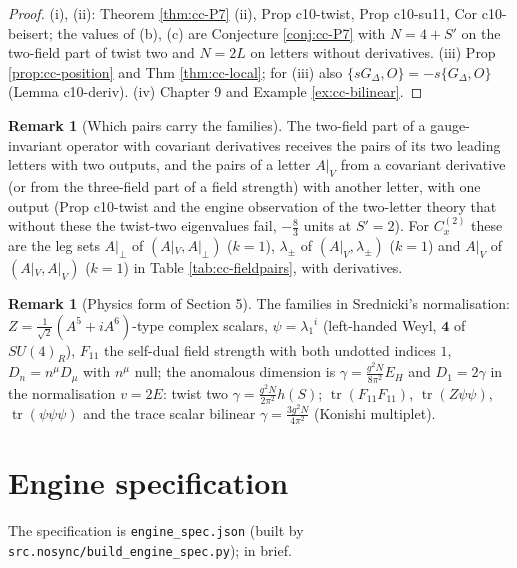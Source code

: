 \documentclass[11pt]{article}
\numberwithin{equation}{section}
\theoremstyle{plain}
\theoremstyle{definition}
\newtheorem{remark}[theorem]{Remark}
\newcommand{\Ap}{A|_{\perp}}
\newcommand{\AV}{A|_V}
\begin{document}
\begin{proof}
(i), (ii): Theorem \ref{thm:cc-P7} (ii), Prop c10-twist, Prop c10-su11, Cor c10-beisert; the values of (b), (c) are Conjecture \ref{conj:cc-P7} with $N=4+S'$ on the two-field part of twist two and $N=2L$ on letters without derivatives. (iii) Prop \ref{prop:cc-position} and Thm \ref{thm:cc-local}; for (iii) also $\{sG_\Delta,O\}=-s\{G_\Delta,O\}$ (Lemma c10-deriv). (iv) Chapter 9 and Example \ref{ex:cc-bilinear}.
\end{proof}

\begin{remark}[Which pairs carry the families]
\label{rem:cc-pairs}
The two-field part of a gauge-invariant operator with covariant derivatives receives the pairs of its two leading letters with two outputs, and the pairs of a letter $\AV$ from a covariant derivative (or from the three-field part of a field strength) with another letter, with one output (Prop c10-twist and the engine observation of the two-letter theory that without these the twist-two eigenvalues fail, $-\tfrac83$ units at $S'=2$). For $C^{(2)}_x$ these are the leg sets $\Ap$ of $(\AV,\Ap)$ ($k=1$), $\lambda_\pm$ of $(\AV,\lambda_\pm)$ ($k=1$) and $\AV$ of $(\AV,\AV)$ ($k=1$) in Table \ref{tab:cc-fieldpairs}, with derivatives.
\end{remark}

\begin{remark}[Physics form of Section 5]
\label{rem:cc-twocomp4}
The families in Srednicki's normalisation: $Z=\tfrac1{\sqrt2}(A^5+iA^6)$-type complex scalars, $\psi=\lambda_1{}^i$ (left-handed Weyl, $\mathbf4$ of $SU(4)_R$), $F_{11}$ the self-dual field strength with both undotted indices $1$, $D_n=n^\mu D_\mu$ with $n^\mu$ null; the anomalous dimension is $\gamma=\tfrac{g^2N}{8\pi^2}E_H$ and $D_1=2\gamma$ in the normalisation $v=2E$: twist two $\gamma=\tfrac{g^2N}{2\pi^2}h(S)$; $\operatorname{tr}(F_{11}F_{11})$, $\operatorname{tr}(Z\psi\psi)$, $\operatorname{tr}(\psi\psi\psi)$ and the trace scalar bilinear $\gamma=\tfrac{3g^2N}{4\pi^2}$ (Konishi multiplet).
\end{remark}

\section{Engine specification}
\label{sec:cc-engine}

The specification is \texttt{engine\_spec.json} (built by \texttt{src.nosync/build\_engine\_spec.py}); in brief.
\end{document}
